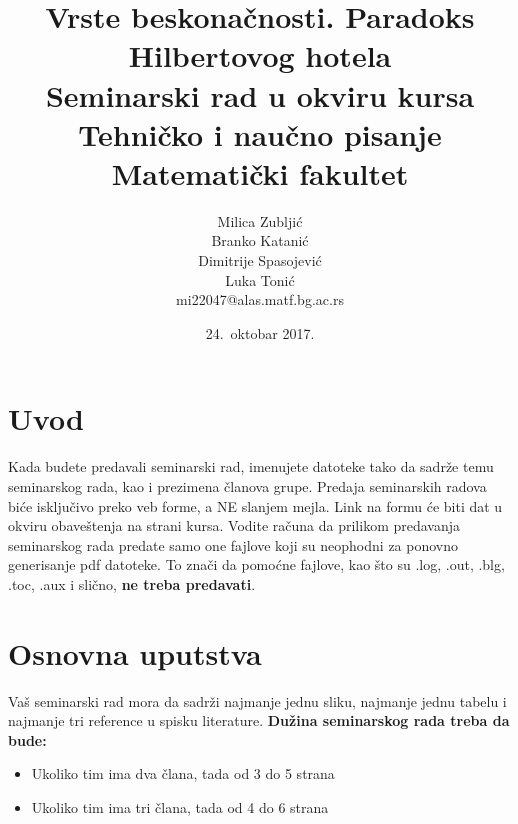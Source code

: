 \documentclass[a4paper]{article}
\begin{document}
\title{Vrste beskonačnosti. Paradoks Hilbertovog hotela\\ \small{Seminarski rad u okviru kursa\\Tehničko i naučno pisanje\\ Matematički fakultet}}

\author{Milica Zubljić\\ Branko Katanić\\ Dimitrije Spasojević\\ Luka Tonić\\ mi22047@alas.matf.bg.ac.rs}
\date{24.~oktobar 2017.}
\maketitle


\tableofcontents

\newpage

\section{Uvod}
\label{sec:uvod}
Kada budete predavali seminarski rad, imenujete datoteke tako da sadrže temu seminarskog rada, kao i prezimena članova grupe. Predaja seminarskih radova biće isključivo preko veb forme, a NE slanjem mejla. Link na formu će biti dat u okviru obaveštenja na strani kursa. Vodite računa da prilikom predavanja seminarskog rada predate samo one fajlove koji su neophodni za ponovno generisanje pdf datoteke. To znači da pomoćne fajlove, kao što su .log, .out, .blg, .toc, .aux i slično, \textbf{ne treba predavati}.

\section{Osnovna uputstva}
Vaš seminarski rad mora da sadrži najmanje jednu sliku, najmanje jednu tabelu i najmanje tri reference u spisku literature. \textbf{Dužina seminarskog rada treba da bude:}
\begin{itemize}
\item Ukoliko tim ima dva člana, tada od 3 do 5 strana
\item Ukoliko tim ima tri člana, tada od 4 do 6 strana
\end{itemize} 
\end{document}
